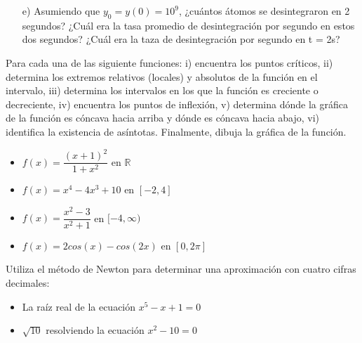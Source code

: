 \documentclass[10pt]{exam}
\begin{document}
\begin{questions}
\begin{itemize}
    \item [e)]  Asumiendo que $y_0 = y(0) = 10^9$, ¿cuántos átomos se desintegraron en 2 segundos? ¿Cuál era la tasa promedio de desintegración por segundo en estos dos segundos? ¿Cuál era la taza de desintegración por segundo en t = 2s?
\end{itemize}



\question Para cada una de las siguiente funciones: i) encuentra los puntos críticos, ii) determina los extremos relativos (locales) y absolutos de la función en el intervalo, iii) determina los intervalos en los que la función es creciente o decreciente, iv) encuentra los puntos de inflexión, v) determina dónde la gráfica de la función es cóncava hacia arriba y dónde es cóncava hacia abajo, vi) identifica la existencia de asíntotas. Finalmente, dibuja la gráfica de la función.

\begin{itemize}
    \item $f(x)=\dfrac{(x+1)^2}{1+x^2}$ en $\mathbb{R}$
    \item $f(x)=x^4-4x^3+10$ en $[-2,4]$
    \item $f(x)=\dfrac{x^2 -3}{x^2 +1}$ en $[-4,\infty)$
    \item $f(x)=2cos(x)-cos(2x)$ en $[0,2\pi]$
\end{itemize}

\question Utiliza el método de Newton para determinar una aproximación con cuatro cifras decimales:

\begin{itemize}
    \item La raíz real de la ecuación $x^5-x+1=0$
    \item $\sqrt{10}$ resolviendo la ecuación $x^2-10=0$
\end{itemize}


    \end{questions}




\pagestyle{foot}    %



\end{document}

